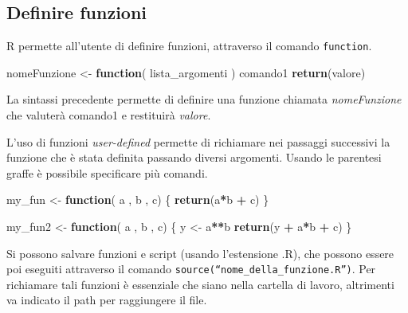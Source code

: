 \documentclass[]{book}
\newenvironment{Shaded}{\begin{snugshade}}{\end{snugshade}}
\newcommand{\ControlFlowTok}[1]{\textcolor[rgb]{0.13,0.29,0.53}{\textbf{#1}}}
\newcommand{\KeywordTok}[1]{\textcolor[rgb]{0.13,0.29,0.53}{\textbf{#1}}}
\newcommand{\NormalTok}[1]{#1}
\newcommand{\OperatorTok}[1]{\textcolor[rgb]{0.81,0.36,0.00}{\textbf{#1}}}
\newcommand{\StringTok}[1]{\textcolor[rgb]{0.31,0.60,0.02}{#1}}
\begin{document}
\hypertarget{definire-funzioni}{%
\subsection{Definire funzioni}\label{definire-funzioni}}

R permette all'utente di definire funzioni, attraverso il comando \texttt{function}.

\begin{Shaded}
\begin{Highlighting}[]
\NormalTok{nomeFunzione <-}\StringTok{ }\ControlFlowTok{function}\NormalTok{( lista_argomenti ) comando1}
\KeywordTok{return}\NormalTok{(valore)}
\end{Highlighting}
\end{Shaded}

La sintassi precedente permette di definire una funzione chiamata \emph{nomeFunzione} che valuterà comando1 e restituirà \emph{valore}.

L'uso di funzioni \emph{user-defined} permette di richiamare nei passaggi successivi la funzione che è stata definita passando diversi argomenti. Usando le parentesi graffe è possibile specificare più comandi.

\begin{Shaded}
\begin{Highlighting}[]
\NormalTok{my_fun <-}\StringTok{ }\ControlFlowTok{function}\NormalTok{( a , b , c) \{}
\KeywordTok{return}\NormalTok{(a}\OperatorTok{*}\NormalTok{b }\OperatorTok{+}\StringTok{ }\NormalTok{c)    }
\NormalTok{\}}
\end{Highlighting}
\end{Shaded}

\begin{Shaded}
\begin{Highlighting}[]
\NormalTok{my_fun2 <-}\StringTok{ }\ControlFlowTok{function}\NormalTok{( a , b , c) \{}
\NormalTok{    y <-}\StringTok{ }\NormalTok{a}\OperatorTok{**}\NormalTok{b }
\KeywordTok{return}\NormalTok{(y }\OperatorTok{+}\StringTok{ }\NormalTok{a}\OperatorTok{*}\NormalTok{b }\OperatorTok{+}\StringTok{ }\NormalTok{c)    }
\NormalTok{\}}
\end{Highlighting}
\end{Shaded}

Si possono salvare funzioni e script (usando l'estensione .R), che possono essere poi eseguiti attraverso il comando \texttt{source(“nome\_della\_funzione.R”)}. Per richiamare tali funzioni è essenziale che siano nella cartella di lavoro, altrimenti va indicato il path per raggiungere il file.
\end{document}
